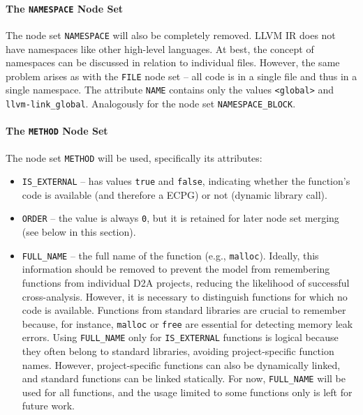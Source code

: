 \paragraph{The \texttt{NAMESPACE} Node Set}
The node set \texttt{NAMESPACE} will also be completely removed. LLVM IR does not have namespaces like other high-level languages. At best, the concept of namespaces can be discussed in relation to individual files. However, the same problem arises as with the \texttt{FILE} node set -- all code is in a single file and thus in a single namespace. The attribute \texttt{NAME} contains only the values \texttt{<global>} and \texttt{llvm-link\_global}. Analogously for the node set \texttt{NAMESPACE\_BLOCK}.

\paragraph{The \texttt{METHOD} Node Set}
The node set \texttt{METHOD} will be used, specifically its attributes:
\begin{itemize}
    \item \texttt{IS\_EXTERNAL} -- has values \texttt{true} and \texttt{false}, indicating whether the function's code is available (and therefore a ECPG) or not (dynamic library call).
    \item \texttt{ORDER} -- the value is always \texttt{0}, but it is retained for later node set merging (see below in this section).
    \item \texttt{FULL\_NAME} -- the full name of the function (e.g., \texttt{malloc}). Ideally, this information should be removed to prevent the model from remembering functions from individual D2A projects, reducing the likelihood of successful cross-analysis. However, it is necessary to distinguish functions for which no code is available. Functions from standard libraries are crucial to remember because, for instance, \texttt{malloc} or \texttt{free} are essential for detecting memory leak errors. Using \texttt{FULL\_NAME} only for \texttt{IS\_EXTERNAL} functions is logical because they often belong to standard libraries, avoiding project-specific function names. However, project-specific functions can also be dynamically linked, and standard functions can be linked statically. For now, \texttt{FULL\_NAME} will be used for all functions, and the usage limited to some functions only is left for future work.
\end{itemize}

